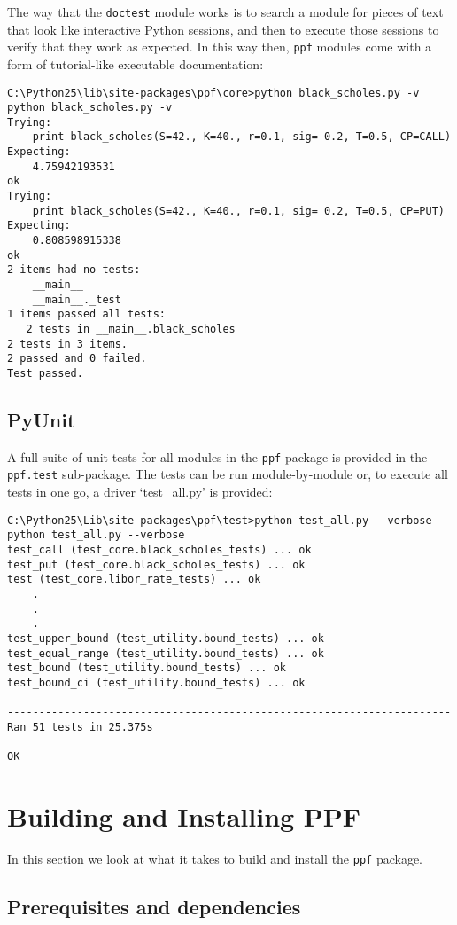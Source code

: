 The way that the \verb|doctest| module works is to search a module for
pieces of text that look like interactive Python sessions, and then
to execute those sessions to verify that they work as expected. In
this way then, \verb|ppf| modules come with a form of tutorial-like
executable documentation:
\begin{verbatim}
C:\Python25\lib\site-packages\ppf\core>python black_scholes.py -v
python black_scholes.py -v
Trying:
    print black_scholes(S=42., K=40., r=0.1, sig= 0.2, T=0.5, CP=CALL)
Expecting:
    4.75942193531
ok
Trying:
    print black_scholes(S=42., K=40., r=0.1, sig= 0.2, T=0.5, CP=PUT)
Expecting:
    0.808598915338
ok
2 items had no tests:
    __main__
    __main__._test
1 items passed all tests:
   2 tests in __main__.black_scholes
2 tests in 3 items.
2 passed and 0 failed.
Test passed.
\end{verbatim}

\subsection{PyUnit}

A full suite of unit-tests for all modules in the \verb|ppf| package
is provided in the \verb|ppf.test| sub-package. The tests can be run
module-by-module or, to execute all tests in one go, a driver
`test\_all.py' is provided:
\begin{verbatim}
C:\Python25\Lib\site-packages\ppf\test>python test_all.py --verbose
python test_all.py --verbose
test_call (test_core.black_scholes_tests) ... ok
test_put (test_core.black_scholes_tests) ... ok
test (test_core.libor_rate_tests) ... ok
    .
    .
    .
test_upper_bound (test_utility.bound_tests) ... ok
test_equal_range (test_utility.bound_tests) ... ok
test_bound (test_utility.bound_tests) ... ok
test_bound_ci (test_utility.bound_tests) ... ok

----------------------------------------------------------------------
Ran 51 tests in 25.375s

OK
\end{verbatim}

\section{Building and Installing PPF}

In this section we look at what it takes to build and install the
\verb|ppf| package.

\subsection{Prerequisites and dependencies}

